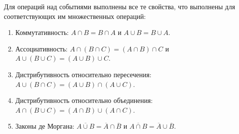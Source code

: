 \begin{notice}
Для операций над событиями выполнены все те свойства, что выполнены для соответствующих им множественных операций:
\begin{enumerate}
    \item Коммутативность: $A \cap B = B \cap A$ и $A \cup B = B \cup A$.
    \item Ассоциативность: $A \cap (B \cap C) = (A \cap B) \cap C$ и $A \cup (B \cup C) = (A \cup B) \cup C$.
    \item Дистрибутивность относительно пересечения: $A \cup (B \cap C) = (A \cup B) \cap (A \cup C)$.
    \item Дистрибутивность относительно объединения: $A \cap (B \cup C) = (A \cap B) \cup (A \cap C)$.
    \item Законы де Моргана: $\overline{A \cup B} = \overline{A} \cap \overline{B}$ и $\overline{A \cap B} = \overline{A} \cup \overline{B}$.
\end{enumerate}
\end{notice}